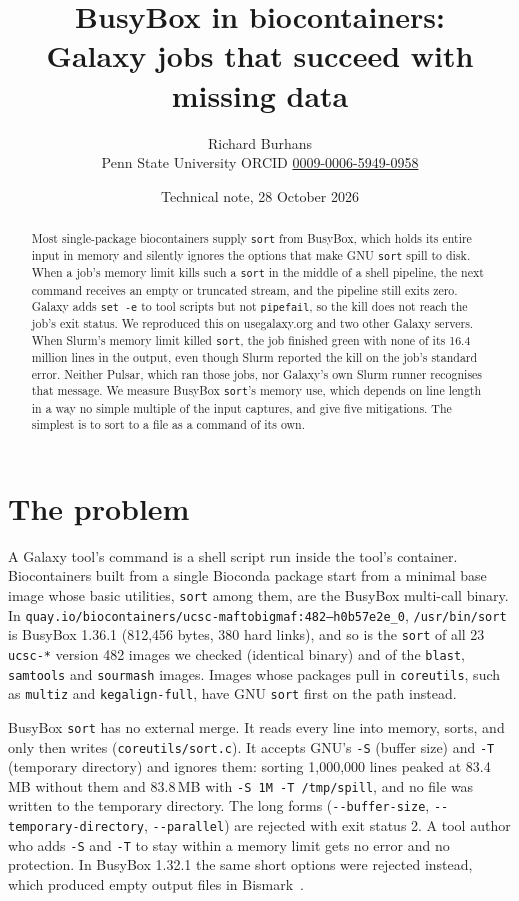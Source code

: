 \documentclass[11pt,letterpaper]{article}
\title{\textbf{BusyBox \code{sort} in biocontainers:\\Galaxy jobs that succeed with missing data}}
\author{Richard Burhans\\\small Penn State University \quad ORCID \href{https://orcid.org/0009-0006-5949-0958}{0009-0006-5949-0958}}
\date{Technical note, 28 October 2026}
\newcommand{\code}[1]{\texttt{#1}}
\begin{document}
\maketitle

\begin{abstract}
\noindent Most single-package biocontainers supply \code{sort} from BusyBox, which holds its entire input in
memory and silently ignores the options that make GNU \code{sort} spill to disk. When a job's memory limit kills
such a \code{sort} in the middle of a shell pipeline, the next command receives an empty or truncated stream, and
the pipeline still exits zero. Galaxy adds \code{set -e} to tool scripts but not \code{pipefail}, so the kill does
not reach the job's exit status. We reproduced this on usegalaxy.org and two other Galaxy servers. When Slurm's
memory limit killed \code{sort}, the job finished green with none of its 16.4 million lines in the output, even
though Slurm reported the kill on the job's standard error. Neither Pulsar, which ran those jobs, nor Galaxy's own
Slurm runner recognises that message.
We measure BusyBox \code{sort}'s memory use, which depends on line length in a way no simple multiple of the input
captures, and give five mitigations. The simplest is to sort to a file as a command of its own.
\end{abstract}

\section{The problem}

A Galaxy tool's command is a shell script run inside the tool's container. Biocontainers built from a single Bioconda
package start from a minimal base image whose basic utilities, \code{sort} among them, are the BusyBox multi-call
binary. In \code{quay.io/biocontainers/ucsc-maftobigmaf:482--h0b57e2e\_0}, \code{/usr/bin/sort} is BusyBox 1.36.1
(812{,}456 bytes, 380 hard links), and so is the \code{sort} of all 23 \code{ucsc-*} version 482 images we checked
(identical binary) and of the \code{blast}, \code{samtools} and \code{sourmash} images. Images whose packages pull
in \code{coreutils}, such as \code{multiz} and \code{kegalign-full}, have GNU \code{sort} first on the path instead.

BusyBox \code{sort} has no external merge. It reads every line into memory, sorts, and only then writes
(\code{coreutils/sort.c}). It accepts GNU's \code{-S} (buffer size) and \code{-T} (temporary directory) and
ignores them: sorting 1{,}000{,}000 lines peaked at 83.4\,MB without them and 83.8\,MB with \code{-S 1M -T
/tmp/spill}, and no file was written to the temporary directory. The long forms (\code{-{}-buffer-size},
\code{-{}-temporary-directory}, \code{-{}-parallel}) are rejected with exit status 2. A tool author who adds
\code{-S} and \code{-T} to stay within a memory limit gets no error and no protection. In BusyBox 1.32.1 the same
short options were rejected instead, which produced empty output files in Bismark~\cite{bismark483}.
\end{document}
